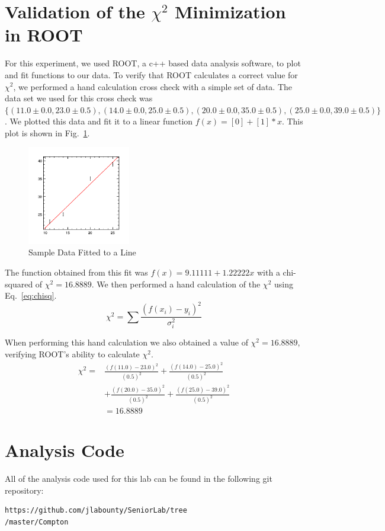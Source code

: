 \documentclass[%
 reprint,
 amsmath,amssymb,
 aps,
 pra,
]{revtex4-1}
\begin{document}
\begin{appendix}
\section{Validation of the $\chi^2$ Minimization in ROOT} \label{section:root}
For this experiment, we used ROOT, a c++ based data analysis software, to plot and fit functions to our data. To verify that ROOT calculates a correct value for $\chi^{2}$, we performed a hand calculation cross check with a simple set of data. The data set we used for this cross check was $\{ (11.0 \pm 0.0, 23.0 \pm 0.5), (14.0 \pm 0.0, 25.0 \pm 0.5), (20.0 \pm 0.0, 35.0 \pm 0.5), (25.0 \pm 0.0, 39.0 \pm 0.5) \}$. We plotted this data and fit it to a linear function $f(x) = [0] + [1]*x$. This plot is shown in Fig.~\ref{Fig:rootproof}.

\begin{figure}[H]
	\centering
	\includegraphics[width=0.4\textwidth]{rootproof.png}
	\caption{Sample Data Fitted to a Line}
	\label{Fig:rootproof}
\end{figure}

The function obtained from this fit was $f(x) = 9.11111 + 1.22222x$ with a chi-squared of $\chi ^{2} = 16.8889$. We then performed a hand calculation of the $\chi ^{2}$ using Eq.~\ref{eq:chisq}.
\begin{equation}\label{eq:chisq}
\chi ^{2} = \sum \frac{(f(x_i) - y_i)^{2}}{\sigma_i^2}
\end{equation}

When performing this hand calculation we also obtained a value of $\chi ^{2} = 16.8889$, verifying ROOT's ability to calculate $\chi ^{2}$.
\begin{align*}
\chi ^{2} =& \frac{(f(11.0) - 23.0)^{2}}{(0.5)^2} + \frac{(f(14.0) - 25.0)^{2}}{(0.5)^2} \\
&+ \frac{(f(20.0) - 35.0)^2}{(0.5)^2} + \frac{(f(25.0) - 39.0)^{2}}{(0.5)^2} \\
&= 16.8889
\end{align*}

\section{Analysis Code} \label{section:analysis_code}

All of the analysis code used for this lab can be found in the following git repository: 
\begin{verbatim}
https://github.com/jlabounty/SeniorLab/tree
/master/Compton
\end{verbatim}

\end{appendix}
\end{document}
